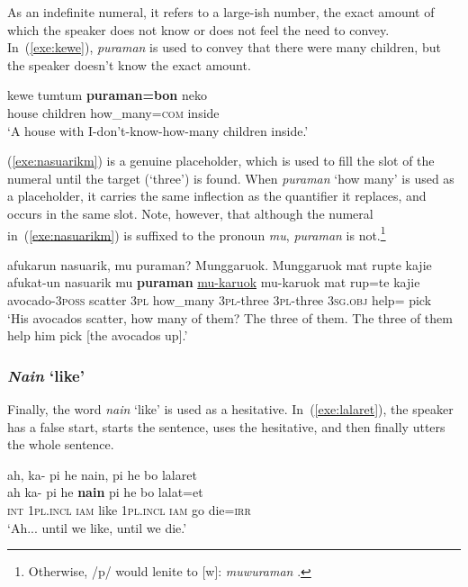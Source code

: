 \documentclass[output=paper,colorlinks,citecolor=brown
\ChapterDOI{10.5281/zenodo.15697587}
]{langscibook}
\begin{document}
As an indefinite numeral, it refers to a large-ish number, the exact amount of which the speaker does not know or does not feel the need to convey. In~(\ref{exe:kewe}), \textit{puraman} is used to convey that there were many children, but the speaker doesn't know the exact amount.

\begin{exe}
    \ex \gll kewe tumtum \textbf{puraman=bon} neko\\
    house children how\_many=\textsc{com} inside\\
    \glt `A house with I-don't-know-how-many children inside.'
    \label{exe:kewe}
\end{exe}

(\ref{exe:nasuarikm}) is a genuine placeholder, which is used to fill the slot of the numeral until the target (`three') is found. When \textit{puraman} `how many' is used as a placeholder, it carries the same inflection as the quantifier it replaces, and occurs in the same slot. Note, however, that although the numeral in~(\ref{exe:nasuarikm}) is suffixed to the pronoun \textit{mu}, \textit{puraman} is not.\footnote{Otherwise, /p/ would lenite to [w]: \textit{muwuraman} \citep[96]{visser2022}.}

\begin{exe}
	\ex \glll afukarun nasuarik, mu puraman? Munggaruok. Munggaruok mat rupte kajie\\
	afukat-un nasuarik mu \textbf{puraman} \uline{mu-karuok} mu-karuok mat rup=te kajie\\
	avocado-\textsc{3poss} scatter \textsc{3pl} how\_many \textsc{3pl}-three \textsc{3pl}-three \textsc{3sg.obj} help={\glte} pick\\
	\glt `His avocados scatter, how many of them? The three of them. The three of them help him pick [the avocados up].' 
	\label{exe:nasuarikm}
\end{exe}


\subsubsection{\textit{Nain} `like'}
Finally, the word \textit{nain} `like' is used as a hesitative. In~(\ref{exe:lalaret}), the speaker has a false start, starts the sentence, uses the hesitative, and then finally utters the whole sentence.

\begin{exe}
	\ex \glll ah, ka- pi he nain, pi he bo lalaret\\
     ah ka- pi he \textbf{nain} pi he bo lalat=et\\
	\textsc{int} {} \textsc{1pl.incl} \textsc{iam} like \textsc{1pl.incl} \textsc{iam} go die=\textsc{irr}\\
	\glt `Ah... until we like, until we die.' 
	\label{exe:lalaret}
\end{exe}
\end{document}
